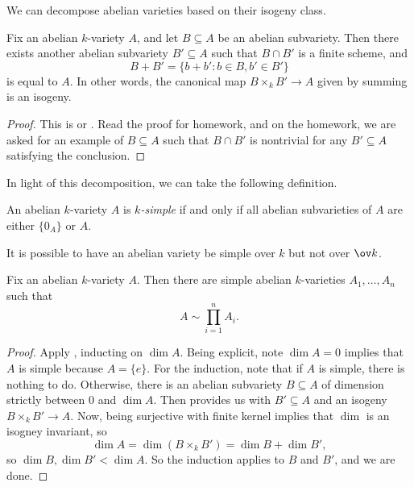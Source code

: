 \documentclass[../notes.tex]{subfiles}
\begin{document}
We can decompose abelian varieties based on their isogeny class.
\begin{theorem} \label{thm:poincare-red}
	Fix an abelian $k$-variety $A$, and let $B\subseteq A$ be an abelian subvariety. Then there exists another abelian subvariety $B'\subseteq A$ such that $B\cap B'$ is a finite scheme, and
	\[B+B'=\{b+b':b\in B,b'\in B'\}\]
	is equal to $A$. In other words, the canonical map $B\times_k B'\to A$ given by summing is an isogeny.
\end{theorem}
\begin{proof}
	This is \cite[p.~160]{mumford} or \cite[Theorem~2.12]{milne-cm}. Read the proof for homework, and on the homework, we are asked for an example of $B\subseteq A$ such that $B\cap B'$ is nontrivial for any $B'\subseteq A$ satisfying the conclusion.\todo{}
\end{proof}
In light of this decomposition, we can take the following definition.
\begin{definition}[simple]
	An abelian $k$-variety $A$ is \textit{$k$-simple} if and only if all abelian subvarieties of $A$ are either $\{0_A\}$ or $A$.
\end{definition}
\begin{remark}
	It is possible to have an abelian variety be simple over $k$ but not over $\ov k$.
\end{remark}
\begin{corollary} \label{cor:factor-ab-var}
	Fix an abelian $k$-variety $A$. Then there are simple abelian $k$-varieties $A_1,\ldots,A_n$ such that
	\[A\sim\prod_{i=1}^nA_i.\]
\end{corollary}
\begin{proof}
	Apply , inducting on $\dim A$. Being explicit, note $\dim A=0$ implies that $A$ is simple because $A=\{e\}$. For the induction, note that if $A$ is simple, there is nothing to do. Otherwise, there is an abelian subvariety $B\subseteq A$ of dimension strictly between $0$ and $\dim A$. Then  provides us with $B'\subseteq A$ and an isogeny $B\times_k B'\to A$. Now, being surjective with finite kernel implies that $\dim$ is an isogney invariant, so
	\[\dim A=\dim(B\times_kB')=\dim B+\dim B',\]
	so $\dim B,\dim B'<\dim A$. So the induction applies to $B$ and $B'$, and we are done.
\end{proof}
\end{document}
